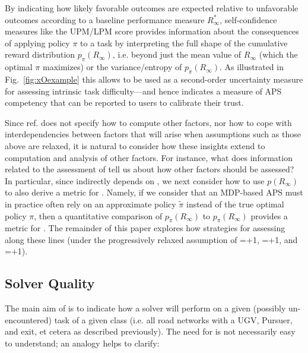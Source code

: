     By indicating how likely favorable outcomes are expected relative to unfavorable outcomes according to a baseline performance measure $R^*_{\infty}$, self-confidence measures like the UPM/LPM score provides information about the consequences of applying policy $\pi$ to a task by interpreting the full shape of the cumulative reward distribution $p_{\pi}(R_{\infty})$, i.e. beyond just the mean value of $R_{\infty}$ (which the optimal $\pi$ maximizes) or the variance/entropy of $p_{\pi}(R_{\infty})$. As illustrated in Fig.~\ref{fig:xOexample} this allows \xO{} to be used as a second-order uncertainty measure for assessing intrinsic task difficulty---and hence indicates a measure of APS competency that can be reported to users to calibrate their trust.

    Since ref. \cite{Aitken2016-cv} does not specify how to compute other factors, nor how to cope with interdependencies between factors that will arise when assumptions such as those above are relaxed, it is natural to consider how these insights extend to computation and analysis of other \famsec{} factors. For instance, what does information related to the assessment of \xO{} tell us about how other factors should be assessed? In particular, since \xO indirectly depends on \xQ, we next consider how to use $p(R_{\infty})$ to also derive a metric for \xQ. Namely, if we consider that an MDP-based APS must in practice often rely on an approximate policy $\tilde{\pi}$ instead of the true optimal policy $\pi$, then a quantitative comparison of $p_{\tilde{\pi}}(R_{\infty})$ to $p_{\pi}(R_{\infty})$ provides a metric for \xQ. The remainder of this paper explores how strategies for assessing \xQ along these lines (under the progressively relaxed assumption of \xM{}=+1, \xP{}=+1, and \xI{}=+1). 

\subsection{Solver Quality} \label{sec:SQ}
    The main aim of \xQ{} is to indicate how a solver \solve{} will perform on a given (possibly un-encountered) task \task{} of a given class \taskclass{} (i.e. all road networks with a UGV, Pursuer, and exit, et cetera as described previously). The need for \xQ{} is not necessarily easy to understand; an analogy helps to clarify:
    


